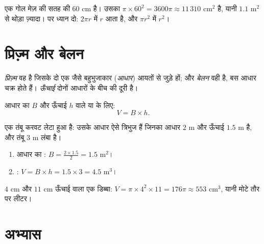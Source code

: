 \begin{example}\label{ex:g7:areas:disk}
एक गोल मेज़ की सतह की  $60$ cm है। उसका 
$\pi \times 60^2 = 3600\pi \approx 11\,310$ cm$^2$ है, यानी
$1.1$ m$^2$ से थोड़ा ज़्यादा।  पर ध्यान दो: \emph{}
$2\pi r$ में $r$ आता है, और \emph{} $\pi r^2$ में $r^2$।
\end{example}

\section{प्रिज़्म और बेलन}

\begin{definition}[प्रिज़्म, बेलन]\label{def:g7:areas:prism}
\emph{प्रिज़्म} वह  है जिसके दो एक जैसे 
बहुभुजाकार  (\emph{आधार}) आयतों से जुड़े हों; और
\emph{बेलन} वही है, बस आधार चक्र होते हैं।
\emph{ऊँचाई} दोनों आधारों के बीच की दूरी है।
\end{definition}

\begin{theorem}[आयतन]\label{thm:g7:areas:volume}
आधार का  $B$ और ऊँचाई $h$ वाले  या  के लिए:
\[
V = B \times h .
\]
\end{theorem}
\admitted

\begin{example}\label{ex:g7:areas:volume}
एक तंबू करवट लेटा हुआ  है: उसके आधार ऐसे त्रिभुज हैं जिनका
आधार $2$ m और ऊँचाई $1.5$ m है, और तंबू $3$ m लंबा है।
\begin{enumerate}
  \item आधार का : $B = \frac{2 \times 1.5}{2} = 1.5$ m$^2$।
  \item {}: $V = B \times h = 1.5 \times 3 = 4.5$ m$^3$।
\end{enumerate}
$4$ cm  और $11$ cm ऊँचाई वाला एक डिब्बा:
$V = \pi \times 4^2 \times 11 = 176\pi \approx 553$ cm$^3$, यानी
मोटे तौर पर  लीटर।
\end{example}

\section{अभ्यास}

